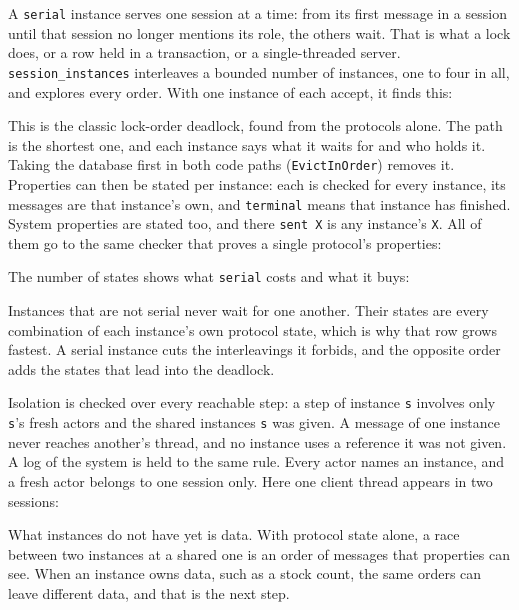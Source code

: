 A \texttt{serial} instance serves one session at a time: from its first message in
a session until that session no longer mentions its role, the others wait. That
is what a lock does, or a row held in a transaction, or a single-threaded server.
\texttt{session\_instances} interleaves a bounded number of instances, one to
four in all, and explores every order. With one instance of each accept, it
finds this:



This is the classic lock-order deadlock, found from the protocols alone. The path is
the shortest one, and each instance says what it waits for and who holds it.
Taking the database first in both code paths (\texttt{EvictInOrder}) removes it.
Properties can then be stated per instance: each is checked for every instance,
its messages are that instance's own, and \texttt{terminal} means that instance
has finished. System properties are stated too, and there \texttt{sent X} is any
instance's \texttt{X}. All of them go to the same checker that proves a single
protocol's properties:



\noindent The number of states shows what \texttt{serial} costs and what it
buys:

\begin{center}
\small

\end{center}

Instances that are not serial never wait for one another. Their states are
every combination of each instance's own protocol state, which is why that row
grows fastest. A serial instance cuts the interleavings it forbids, and the
opposite order adds the states that lead into the deadlock.

Isolation is checked over every reachable step: a step of instance \texttt{s}
involves only \texttt{s}'s fresh actors and the shared instances \texttt{s} was
given. A message of one instance never reaches another's thread, and no instance
uses a reference it was not given. A log of the system is held to the same rule.
Every actor names an instance, and a fresh actor belongs to one session only.
Here one client thread appears in two sessions:



\noindent What instances do not have yet is data. With protocol state alone, a race
between two instances at a shared one is an order of messages that properties can
see. When an instance owns data, such as a stock count, the same orders can leave
different data, and that is the next step.

